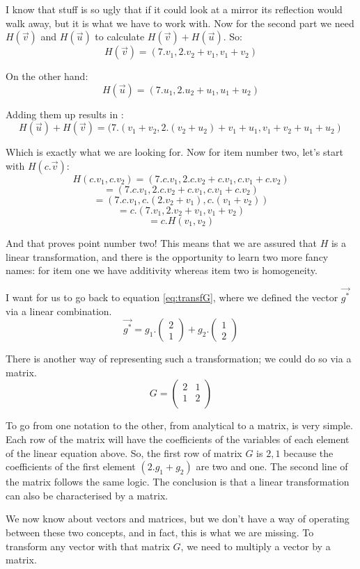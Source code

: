 \documentclass[a4,12pt,twosided,openany]{memoir}
\begin{document}
I know that stuff is so ugly that if it could look at a mirror its reflection would walk away, but it is what we have to work with. Now for the second part we need $H(\overrightarrow{v})$ and $H(\overrightarrow{u})$ to calculate $H(\overrightarrow{v}) + H(\overrightarrow{u})$. So:
\[H(\overrightarrow{v}) = (7.v_1, 2.v_2 + v_1, v_1 + v_2)\]
\par 
\indent
On the other hand:
\[H(\overrightarrow{u}) = (7.u_1, 2.u_2 + u_1, u_1 + u_2)\]
\par 
\indent
Adding them up results in :
\[H(\overrightarrow{u}) + H(\overrightarrow{v}) = (7.(v_1 + v_2, 2.(v_2 + u_2) + v_1 + u_1, v_1 + v_2 + u_1 + u_2 )\]
\par 
\indent
Which is exactly what we are looking for. Now for item number two, let's start with $H(c.\overrightarrow{v})$:
\[H(c.v_1, c.v_2) = (7.c.v_1, 2.c.v_2 + c.v_1, c.v_1 + c.v_2)\]
\[=(7.c.v_1, 2.c.v_2 + c.v_1, c.v_1 + c.v_2)\]
\[=(7.c.v_1, c.(2.v_2 + v_1), c.(v_1 + v_2))\]
\[=c.(7.v_1, 2.v_2 + v_1, v_1 + v_2 )\]
\[=c.H(v_1, v_2)\]
\par 
\indent
And that proves point number two! This means that we are assured that $H$ is a linear transformation, and there is the opportunity to learn two more fancy names: for item one we have additivity whereas item two is homogeneity.
\par 
\indent
I want for us to go back to equation \ref{eq:transfG}, where we defined the vector $\overrightarrow{g^*}$ via a linear combination.
\[\overrightarrow{g^*} = g_1.\begin{pmatrix}
 2\\
 1
 \end{pmatrix} + g_2.\begin{pmatrix}
 1\\
 2
 \end{pmatrix}\]

There is another way of representing such a transformation; we could do so via a matrix.
\[G = 
\begin{pmatrix}
2 & 1 \\
1 & 2 \\
\end{pmatrix}
\]
\par 
\indent
To go from one notation to the other, from analytical to a matrix, is very simple. Each row of the matrix will have the coefficients of the variables of each element of the linear equation above. So, the first row of matrix $G$ is $2,1$ because the coefficients of the first element $(2.g_1+g_2)$ are two and one. The second line of the matrix follows the same logic. The conclusion is that a linear transformation can also be characterised by a matrix.
\par 
\indent
We now know about vectors and matrices, but we don’t have a way of operating between these two concepts, and in fact, this is what we are missing. To transform any vector with that matrix $G$, we need to multiply a vector by a matrix.
\end{document}
